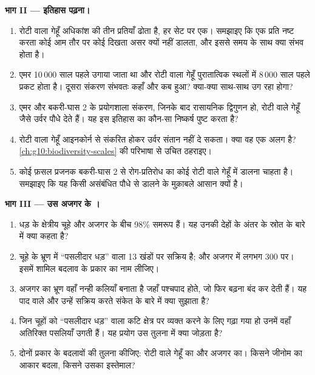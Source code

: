 \begin{problem}
\medskip
\noindent\textbf{भाग II --- इतिहास पढ़ना।}
\begin{enumerate}[resume]
  \item रोटी वाला गेहूँ अधिकांश  की तीन प्रतियाँ ढोता है, हर सेट पर
        एक। समझाइए कि एक प्रति नष्ट करता कोई  आम तौर पर कोई
        दिखता असर क्यों नहीं डालता, और इससे समय के साथ क्या संभव होता है।
  \item एमर 10\,000 साल पहले उगाया जाता था और रोटी वाला गेहूँ पुरातात्विक
        स्थलों में 8\,000 साल पहले प्रकट होता है। दूसरा संकरण संभवतः कहाँ
        और कब हुआ? क्या-क्या साथ-साथ उग रहा होगा?
  \item एमर और बकरी-घास 2 के प्रयोगशाला संकरण, जिनके बाद रासायनिक
        द्विगुणन हो, रोटी वाले गेहूँ जैसे उर्वर पौधे देते हैं। यह इस
        इतिहास का कौन-सा निष्कर्ष पुष्ट करता है?
  \item रोटी वाला गेहूँ आइनकोर्न से संकरित होकर उर्वर संतान नहीं दे सकता।
        क्या वह एक अलग  है? \cref{ch:g10:biodiversity-scales} की
        परिभाषा से उचित ठहराइए।
  \item कोई फ़सल प्रजनक बकरी-घास 2 से रोग-प्रतिरोध का कोई  रोटी वाले
        गेहूँ में डालना चाहता है। समझाइए कि यह किसी असंबंधित पौधे से डालने
        के मुक़ाबले आसान क्यों है।
\end{enumerate}

\medskip
\noindent\textbf{भाग III --- उस अजगर के ।}
\begin{enumerate}[resume]
  \item धड़ के क्षेत्रीय  चूहे और अजगर के बीच 98\% समरूप हैं। यह उनकी
        देहों के अंतर के स्रोत के बारे में क्या कहता है?
  \item चूहे के भ्रूण में ``पसलीदार धड़'' वाला  13 खंडों पर सक्रिय है;
        और अजगर में लगभग 300 पर। इसमें शामिल बदलाव के प्रकार का नाम
        लीजिए।
  \item अजगर का भ्रूण वहाँ नन्ही कलियाँ बनाता है जहाँ पश्चपाद होते, जो फिर
        बढ़ना बंद कर देती हैं। यह पाद वाले  और उन्हें सक्रिय करते
        संकेत के बारे में क्या सुझाता है?
  \item जिन चूहों को ``पसलीदार धड़'' वाला  कटि क्षेत्र पर व्यक्त करने के
        लिए गढ़ा गया हो उनमें वहाँ अतिरिक्त पसलियाँ उगती हैं। यह प्रयोग उस
        तुलना में क्या जोड़ता है?
  \item दोनों प्रकार के बदलावों की तुलना कीजिए: रोटी वाले गेहूँ का और अजगर
        का। किसने जीनोम का आकार बदला, किसने उसका इस्तेमाल?
\end{enumerate}


\end{problem}

